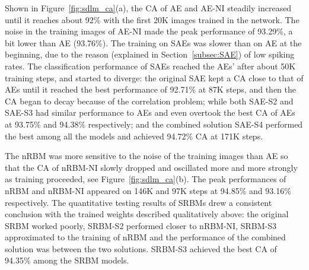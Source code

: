 Shown in Figure~\ref{fig:sdlm_ca}(a), the CA of AE and AE-NI steadily increased until it reaches about 92\% with the first 20K images trained in the network.
The noise in the training images of AE-NI made the peak performance of 93.29\%, a bit lower than AE (93.76\%).
The training on SAEs was slower than on AE at the beginning, due to the reason (explained in Section~\ref{subsec:SAE}) of low spiking rates.
The classification performance of SAEs reached the AEs' after about 50K training steps, and started to diverge:
the original SAE kept a CA close to that of AEs until it reached the best performance of 92.71\% at 87K steps, and then the CA began to decay because of the correlation problem;
while both SAE-S2 and SAE-S3 had similar performance to AEs and even overtook the best CA of AEs at 93.75\% and 94.38\% respectively;
and the combined solution SAE-S4 performed the best among all the models and achieved 94.72\% CA at 171K steps.

The nRBM was more sensitive to the noise of the training images than AE so that the CA of nRBM-NI slowly dropped and oscillated more and more strongly as training proceeded, see Figure~\ref{fig:sdlm_ca}(b).
The peak performances of nRBM and nRBM-NI appeared on 146K and 97K steps at 94.85\% and 93.16\% respectively. 
The quantitative testing results of SRBMs drew a consistent conclusion with the trained weights described qualitatively above: the original SRBM worked poorly, SRBM-S2 performed closer to nRBM-NI, SRBM-S3 approximated to the training of nRBM and the performance of the combined solution was between the two solutions.
SRBM-S3 achieved the best CA of 94.35\% among the SRBM models.

